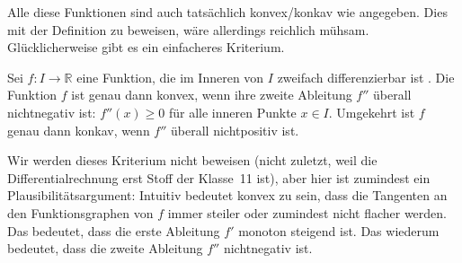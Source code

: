 Alle diese Funktionen sind auch tatsächlich konvex/konkav wie angegeben. Dies mit der Definition zu beweisen, wäre allerdings reichlich mühsam. Glücklicherweise gibt es ein einfacheres Kriterium.

\begin{satzmitnamen}[Lemma]
	Sei $f\colon I\rightarrow \mathbb R$ eine Funktion, die im Inneren von $I$ zweifach differenzierbar ist . Die Funktion $f$ ist genau dann konvex, wenn ihre zweite Ableitung $f''$ überall nichtnegativ ist: $f''(x)\geqslant 0$ für alle inneren Punkte $x\in I$. Umgekehrt ist $f$ genau dann konkav, wenn $f''$ überall nichtpositiv ist.
\end{satzmitnamen}
	
Wir werden dieses Kriterium nicht beweisen (nicht zuletzt, weil die Differentialrechnung erst Stoff der Klasse~11 ist), aber hier ist zumindest ein Plausibilitätsargument: Intuitiv bedeutet konvex zu sein, dass die Tangenten an den Funktionsgraphen von $f$ immer steiler oder zumindest nicht flacher werden. Das bedeutet, dass die erste Ableitung $f'$ monoton steigend ist. Das wiederum bedeutet, dass die zweite Ableitung $f''$ nichtnegativ ist.


